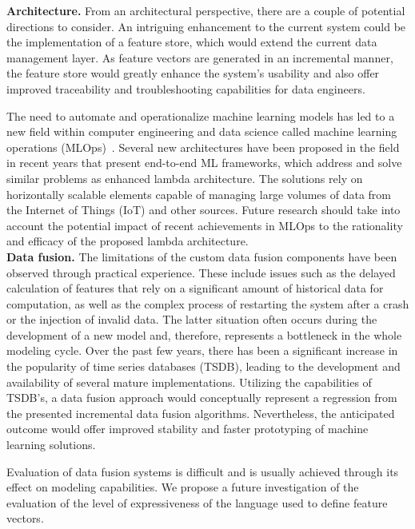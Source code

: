 \noindent \textbf{Architecture.} 
From an architectural perspective, there are a couple of potential directions to consider. 
An intriguing enhancement to the current system could be the implementation of a feature store, which would extend the current data management layer. 
As feature vectors are generated in an incremental manner, the feature store would greatly enhance the system's usability and also offer improved traceability and troubleshooting capabilities for data engineers.

The need to automate and operationalize machine learning models has led to a new field within computer engineering and data science called machine learning operations (MLOps)~\cite{kreuzberger:2023:mlops}.
Several new architectures have been proposed in the field in recent years that present end-to-end ML frameworks, which address and solve similar problems as enhanced lambda architecture.
The solutions rely on horizontally scalable elements capable of managing large volumes of data from the Internet of Things (IoT) and other sources.
Future research should take into account the potential impact of recent achievements in MLOps to the rationality and efficacy of the proposed lambda architecture.
\\

\noindent \textbf{Data fusion.}
The limitations of the custom data fusion components have been observed through practical experience. 
These include issues such as the delayed calculation of features that rely on a significant amount of historical data for computation, as well as the complex process of restarting the system after a crash or the injection of invalid data.
The latter situation often occurs during the development of a new model and, therefore, represents a bottleneck in the whole modeling cycle.
Over the past few years, there has been a significant increase in the popularity of time series databases (TSDB), leading to the development and availability of several mature implementations.
Utilizing the capabilities of TSDB's, a data fusion approach would conceptually represent a regression from the presented incremental data fusion algorithms. 
Nevertheless, the anticipated outcome would offer improved stability and faster prototyping of machine learning solutions.

Evaluation of data fusion systems is difficult and is usually achieved through its effect on modeling capabilities.
We propose a future investigation of the evaluation of the level of expressiveness of the language used to define feature vectors.

